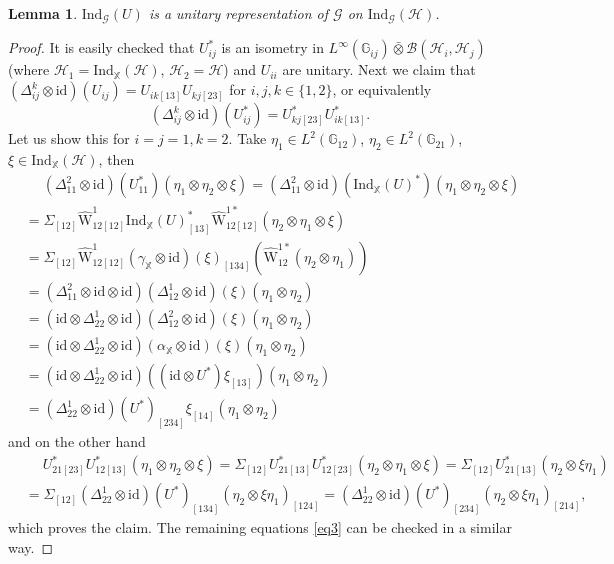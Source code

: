 \documentclass[reqno]{amsart}
\numberwithin{equation}{section}
\newtheorem{Lem}[Theorem]{Lemma}
\newcommand{\id}{\mathrm{id}}
\newcommand{\G}{\mathbb{G}}
\newcommand{\X}{\mathbb{X}}
\newcommand{\msG}{\mathscr{G}}
\newcommand{\Ind}{\mathrm{Ind}}
\newcommand{\mc}{\mathcal}
\newcommand{\GG}{\mathbb{G}}
\newcommand{\ww}{\mathrm{W}}
\begin{document}
\begin{Lem}
$\Ind_{\msG}(U)$ is a unitary representation of $\msG$ on $\Ind_{\msG}(\mc{H})$.
\end{Lem}

\begin{proof}
It is easily checked that $U_{ij}^*$ is an isometry in $L^{\infty}(\G_{ij})\bar\otimes \mc{B}(\mc{H}_i,\mc{H}_j)$ (where $\mc{H}_1=\Ind_{\X}(\mc{H})$, $\mc{H}_2=\mc{H}$) and $U_{ii}$ are unitary. Next we claim that $(\Delta_{ij}^k\otimes\id)(U_{ij})=U_{ik[13]}U_{kj [23]}$ for $i,j,k\in \{1,2\}$, or equivalently
\begin{equation}\label{eq3}
(\Delta_{ij}^k\otimes\id)(U_{ij}^*)=U_{kj [23]}^*U_{ik[13]}^*.
\end{equation}
Let us show this for $i=j=1,k=2$. Take $\eta_1\in L^2(\GG_{12})$, $\eta_2\in L^2(\GG_{21})$, $\xi\in \Ind_{\X}(\mc{H})$, then
\[\begin{split}
&\quad\;
(\Delta^2_{11}\otimes \id)(U^*_{11})(\eta_1\otimes\eta_2\otimes\xi)=
(\Delta^2_{11}\otimes \id)(\Ind_{\X}(U)^*)(\eta_1\otimes\eta_2\otimes\xi)\\
&=
\Sigma_{[12]}
\hat{\ww}^{1}_{12[12]} \Ind_{\X}(U)^*_{[13]}
\hat{\ww}^{1 *}_{12 [12]} (\eta_2\otimes\eta_1\otimes\xi)\\
&=
\Sigma_{[12]}
\hat{\ww}^{1}_{12[12]} 
(\gamma_{\X}\otimes\id)(\xi)_{[134]}
(\hat{\ww}^{1 *}_{12 } (\eta_2\otimes\eta_1))\\
&=
 (\Delta_{11}^2\otimes\id\otimes\id)(\Delta_{12}^1\otimes\id)(\xi)
 (\eta_1\otimes\eta_2)\\
 &=
  (\id\otimes \Delta_{22}^{1} \otimes\id)(\Delta_{12}^2\otimes\id)(\xi)
 (\eta_1\otimes\eta_2)\\
 &= 
  (\id\otimes \Delta_{22}^{1} \otimes\id)(\alpha_{\X}\otimes\id)(\xi)
 (\eta_1\otimes\eta_2)\\
 &=
  (\id\otimes \Delta_{22}^{1} \otimes\id)
  ( (\id\otimes U^*)\xi_{[13]})
 (\eta_1\otimes\eta_2)\\
 &=
   (\Delta_{22}^{1} \otimes\id)
  ( U^*)_{[234]}\xi_{[1 4]}
 (\eta_1\otimes\eta_2)
\end{split}\]
and on the other hand
\[\begin{split}
&\quad\;
U^*_{21 [23]} U^*_{12[13]} (\eta_1\otimes\eta_2\otimes\xi)=
\Sigma_{[12]} U^*_{21 [13]} U^*_{12[23]} (\eta_2\otimes\eta_1\otimes\xi)=
\Sigma_{[12]} U^*_{21 [13]}  (\eta_2\otimes\xi\eta_1)\\
&=
\Sigma_{[12]} 
(\Delta^1_{22}\otimes\id)(U^*)_{[134]} (\eta_2\otimes\xi\eta_1)_{[124]}=
(\Delta^1_{22}\otimes\id)(U^*)_{[234]} (\eta_2\otimes\xi\eta_1)_{[214]},
\end{split}\]
which proves the claim. The remaining equations \eqref{eq3} can be checked in a similar way.


\end{proof}
\end{document}

